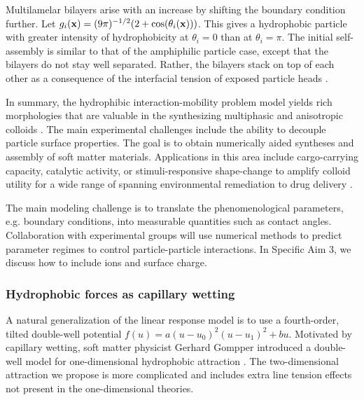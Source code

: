 Multilamelar bilayers arise with an increase by shifting the boundary condition
further. Let $g_i(\mathbf{x}) = (9\pi )^{-1/2}(2 + \cos(\theta_i(\mathbf{x})))$.
This gives a hydrophobic particle with greater intensity of hydrophobicity
at $\theta_i = 0$ than at $\theta_i = \pi$.  The initial self-assembly
is similar to that of the amphiphilic particle case, except that the bilayers
do not stay well separated.  Rather, the bilayers stack on top of each
other as a consequence of the interfacial tension of exposed particle heads \cite{deMeetal21}. 

In summary, the hydrophibic interaction-mobility problem model yields
rich morphologies that are valuable in the synthesizing multiphasic and
anisotropic colloids \cite{Bradley2016,Mallory2017,Bradley2017}.
The main experimental challenges include the ability to
decouple particle surface properties.
The goal is to obtain numerically aided 
syntheses and assembly of soft matter materials.
Applications in this area include cargo-carrying capacity, 
catalytic activity, or stimuli-responsive shape-change to amplify colloid
utility for a wide range of  spanning environmental remediation to drug
delivery \cite{McBr21, HaBr20}.







The main modeling challenge is to translate the phenomenological
parameters, e.g. boundary conditions, into measurable quantities
such as contact angles. Collaboration with experimental groups will
use numerical methods to predict parameter regimes 
to control particle-particle interactions. In Specific Aim 3, we
discuss how to include ions and surface charge. 

\subsubsection{Hydrophobic forces as capillary wetting}
A natural generalization of the linear response model is to use a
fourth-order, tilted double-well potential $f(u) = a(u-u_0)^2(u-u_1)^2 +
bu$. Motivated by capillary wetting, soft matter physicist Gerhard
Gompper introduced a double-well model for one-dimensional hydrophobic
attraction \cite{GoHaKo94}. The two-dimensional attraction we propose is
more complicated and includes extra line tension effects not present in
the one-dimensional theories. 

